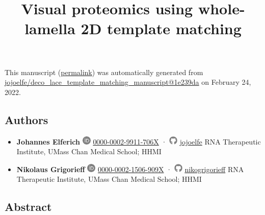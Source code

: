 \documentclass[
]{article}
\title{Visual proteomics using whole-lamella 2D template matching}
\author{}
\date{}
\begin{document}
\maketitle

This manuscript
(\href{https://jojoelfe.github.io/deco_lace_template_matching_manuscript/v/1e239da5dfa82be752529df88887c5cf4896c57d/}{permalink})
was automatically generated
from \href{https://github.com/jojoelfe/deco_lace_template_matching_manuscript/tree/1e239da5dfa82be752529df88887c5cf4896c57d}{jojoelfe/deco\_lace\_template\_matching\_manuscript@1e239da}
on February 24, 2022.

\hypertarget{authors}{%
\subsection{Authors}\label{authors}}

\begin{itemize}
\item
  \textbf{Johannes Elferich}
  \includegraphics[width=0.16667in,height=0.16667in]{images/orcid.pdf}
  \href{https://orcid.org/0000-0002-9911-706X}{0000-0002-9911-706X}
  · \includegraphics[width=0.16667in,height=0.16667in]{images/github.pdf}
  \href{https://github.com/jojoelfe}{jojoelfe}
  RNA Therapeutic Institute, UMass Chan Medical School; HHMI
\item
  \textbf{Nikolaus Grigorieff}
  \includegraphics[width=0.16667in,height=0.16667in]{images/orcid.pdf}
  \href{https://orcid.org/0000-0002-1506-909X}{0000-0002-1506-909X}
  · \includegraphics[width=0.16667in,height=0.16667in]{images/github.pdf}
  \href{https://github.com/nikogrigorieff}{nikogrigorieff}
  RNA Therapeutic Institute, UMass Chan Medical School; HHMI
\end{itemize}

\hypertarget{abstract}{%
\subsection{Abstract}\label{abstract}}
\end{document}
